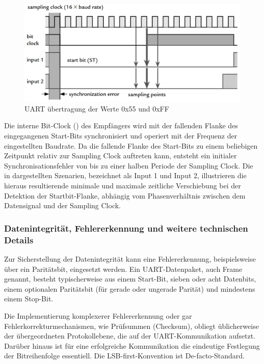 \newpage
\begin{figure}[h!]
	\centering
	\includegraphics[width=1.0\textwidth]{../Bilder/uart_protocoll.png}
	\caption{UART \"ubertragung der Werte 0x55 und 0xFF\\}
	\label{fig:uart_uebertragung}
\end{figure}

Die interne Bit-Clock () des Empf\"angers wird mit der fallenden Flanke des eingegangenen Start-Bits synchronisiert und operiert mit der Frequenz der eingestellten Baudrate. Da die fallende Flanke des Start-Bits zu einem beliebigen Zeitpunkt relativ zur Sampling Clock auftreten kann, entsteht ein initialer Synchronisationsfehler von bis zu einer halben Periode der Sampling Clock. Die in  dargestellten Szenarien, bezeichnet als \glqq Input 1\grqq{} und \glqq Input 2\grqq{}, illustrieren die hieraus resultierende minimale und maximale zeitliche Verschiebung bei der Detektion der Startbit-Flanke, abh\"angig vom Phasenverh\"altnis zwischen dem Datensignal und der Sampling Clock. 

\subsubsection{Datenintegrit\"at, Fehlererkennung und weitere technischen Details}
\label{sec:datenintegritaet}

Zur Sicherstellung der Datenintegrit\"at kann eine Fehlererkennung, beispielsweise \"uber ein Parit\"atsbit, eingesetzt werden. Ein UART-Datenpaket, auch Frame genannt, besteht typischerweise aus einem Start-Bit, sieben oder acht Datenbits, einem optionalen Parit\"atsbit (f\"ur gerade oder ungerade Parit\"at) und mindestens einem Stop-Bit.

\newpage
Die Implementierung komplexerer Fehlererkennung oder gar Fehlerkorrekturmechanismen, wie \zB Pr\"ufsummen (Checksum), obliegt \"ublicherweise der \"ubergeordneten Protokollebene, die auf der UART-Kommunikation aufsetzt. Dar\"uber hinaus ist f\"ur eine erfolgreiche Kommunikation die eindeutige Festlegung der Bitreihenfolge essentiell. Die LSB-first-Konvention ist De-facto-Standard.

